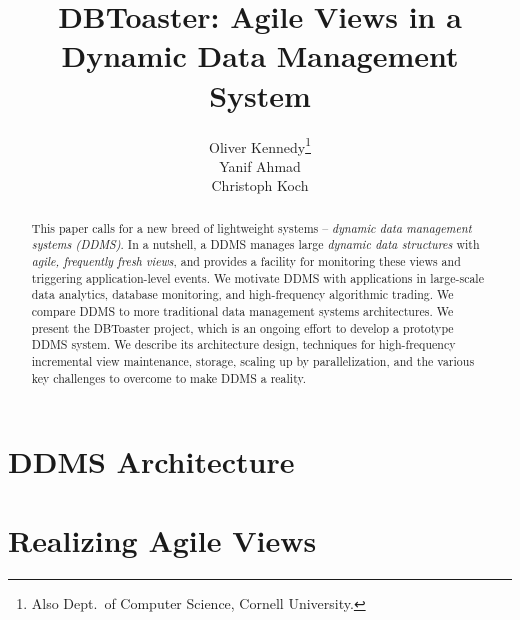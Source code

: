 \documentclass{sig-alternate}
\begin{document}
\title{DBToaster: Agile Views in a\\Dynamic Data Management System}
\author{
\alignauthor
Oliver Kennedy\thanks{Also Dept.\ of Computer Science, Cornell University.}\\
\alignauthor
Yanif Ahmad\\
\alignauthor
Christoph Koch\\
}
\maketitle

\begin{abstract}
This paper calls for a new breed of lightweight systems --
{\em dynamic data management systems (DDMS)}\/.
In a nutshell,
a DDMS manages large {\em dynamic data structures}\/ with 
{\em agile, frequently fresh views}\/, and provides a facility for monitoring
these views and triggering application-level events.
We motivate DDMS with applications in large-scale data analytics, 
database monitoring, and high-frequency algorithmic trading. 
We compare DDMS to more traditional data management systems
architectures.
%
We present the DBToaster project, which is an ongoing effort to
develop a prototype DDMS system. We describe its architecture
design, techniques for high-frequency incremental view maintenance,
storage, scaling up by parallelization, and
the various key challenges to overcome to make DDMS a reality.
\end{abstract}



\section{DDMS Architecture}
\label{sec:overview}



\section{Realizing Agile Views}
\label{sec:dbtoaster}

\end{document}
